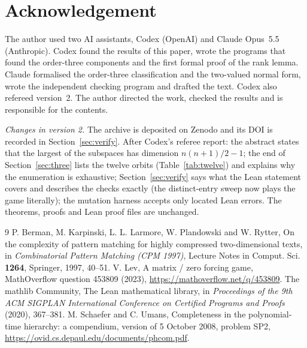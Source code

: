 \documentclass[11pt]{article}
\theoremstyle{definition}
\theoremstyle{remark}
\begin{document}
\section*{Acknowledgement}

The author used two AI assistants, Codex (OpenAI) and Claude Opus~5.5 (Anthropic). Codex found the results of this paper, wrote the programs that found the order-three components and the first formal proof of the rank lemma. Claude formalised the order-three classification and the two-valued normal form, wrote the independent checking program and drafted the text. Codex also refereed version~2. The author directed the work, checked the results and is responsible for the contents.

\emph{Changes in version 2.} The archive is deposited on Zenodo and its DOI is recorded in Section~\ref{sec:verify}. After Codex's referee report: the abstract states that the largest of the subspaces has dimension $n(n+1)/2-1$; the end of Section~\ref{sec:three} lists the twelve orbits (Table~\ref{tab:twelve}) and explains why the enumeration is exhaustive; Section~\ref{sec:verify} says what the Lean statement covers and describes the checks exactly (the distinct-entry sweep now plays the game literally); the mutation harness accepts only located Lean errors. The theorems, proofs and Lean proof files are unchanged.

\begin{thebibliography}{9}
 P. Berman, M. Karpinski, L. L. Larmore, W. Plandowski and W. Rytter, On the complexity of pattern matching for highly compressed two-dimensional texts, in \emph{Combinatorial Pattern Matching (CPM 1997)}, Lecture Notes in Comput. Sci. \textbf{1264}, Springer, 1997, 40--51.
 V. Lev, A matrix / zero forcing game, MathOverflow question 453809 (2023), \url{https://mathoverflow.net/q/453809}.
 The mathlib Community, The Lean mathematical library, in \emph{Proceedings of the 9th ACM SIGPLAN International Conference on Certified Programs and Proofs} (2020), 367--381.
 M. Schaefer and C. Umans, Completeness in the polynomial-time hierarchy: a compendium, version of 5 October 2008, problem SP2, \url{https://ovid.cs.depaul.edu/documents/phcom.pdf}.
\end{thebibliography}
\end{document}
